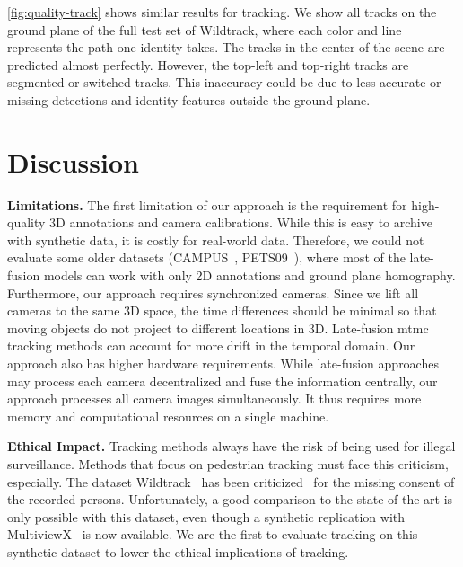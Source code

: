 \documentclass[10pt,twocolumn,letterpaper]{article}
\newcommand{\nparagraph}[1]{\noindent\textbf{#1.  }}
\begin{document}
\cref{fig:quality-track} shows similar results for tracking. We show all tracks on the ground plane of the full test set of Wildtrack, where each color and line represents the path one identity takes. The tracks in the center of the scene are predicted almost perfectly. However, the top-left and top-right tracks are segmented or switched tracks. This inaccuracy could be due to less accurate or missing detections and identity features outside the ground plane.

 \section{Discussion}

\nparagraph{Limitations} The first limitation of our approach is the requirement for high-quality 3D annotations and camera calibrations. While this is easy to archive with synthetic data, it is costly for real-world data. Therefore, we could not evaluate some older datasets (CAMPUS~\cite{xu2016multi}, PETS09~\cite{ferryman2009pets2009}), where most of the late-fusion models can work with only 2D annotations and ground plane homography.
Furthermore, our approach requires synchronized cameras. Since we lift all cameras to the same 3D space, the time differences should be minimal so that moving objects do not project to different locations in 3D. Late-fusion \gls{mtmc} tracking methods can account for more drift in the temporal domain. Our approach also has higher hardware requirements. While late-fusion approaches may process each camera decentralized and fuse the information centrally, our approach processes all camera images simultaneously. It thus requires more memory and computational resources on a single machine.

\nparagraph{Ethical Impact}Tracking methods always have the risk of being used for illegal surveillance. Methods that focus on pedestrian tracking must face this criticism, especially. The dataset Wildtrack~\cite{chavdarova2018wildtrack} has been criticized~\cite{Exposing.ai} for the missing consent of the recorded persons. Unfortunately, a good comparison to the state-of-the-art is only possible with this dataset, even though a synthetic replication with MultiviewX~\cite{hou2020multiview} is now available. We are the first to evaluate tracking on this synthetic dataset to lower the ethical implications of tracking.
\end{document}
